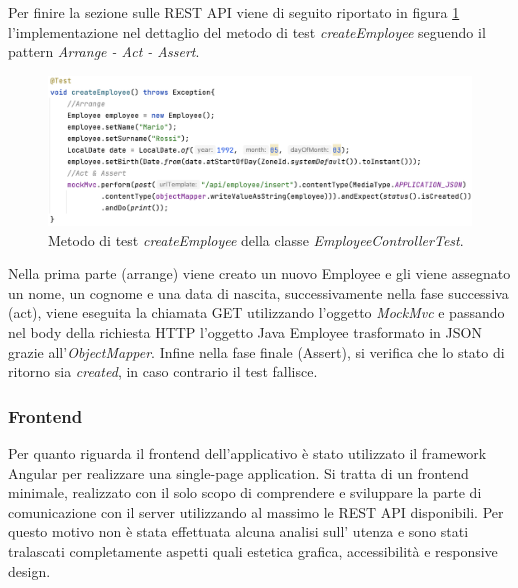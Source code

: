 Per finire la sezione sulle REST API viene di seguito riportato in figura \ref{create-employee} l'implementazione nel dettaglio del metodo di test \textit{createEmployee} seguendo il pattern \textit{Arrange - Act - Assert}.
\FloatBarrier
\begin{figure}[!ht]
\begin{mdframed}
\centering
\includegraphics[width=1\linewidth]{immagini/createEmployee.png}
\end{mdframed}
\caption{Metodo di test \textit{createEmployee} della classe \textit{EmployeeControllerTest}.}
\label{create-employee}
\end{figure}
\FloatBarrier
Nella prima parte (arrange) viene creato un nuovo Employee e gli viene assegnato un nome, un cognome e una data di nascita, successivamente nella fase successiva (act), viene eseguita la chiamata GET utilizzando l'oggetto \textit{MockMvc} e passando nel body della richiesta HTTP l'oggetto Java Employee trasformato in JSON grazie all'\textit{ObjectMapper}. Infine nella fase finale (Assert), si verifica che lo stato di ritorno sia \textit{created}, in caso contrario il test fallisce.
\subsubsection*{Frontend}
Per quanto riguarda il frontend dell'applicativo è stato utilizzato il framework Angular per realizzare una single-page application. Si tratta di un frontend minimale, realizzato con il solo scopo di comprendere e sviluppare la parte di comunicazione con il server utilizzando al massimo le REST API disponibili. Per questo motivo non è stata effettuata alcuna analisi sull' utenza e sono stati tralascati completamente aspetti quali estetica grafica, accessibilità e responsive design.\\
